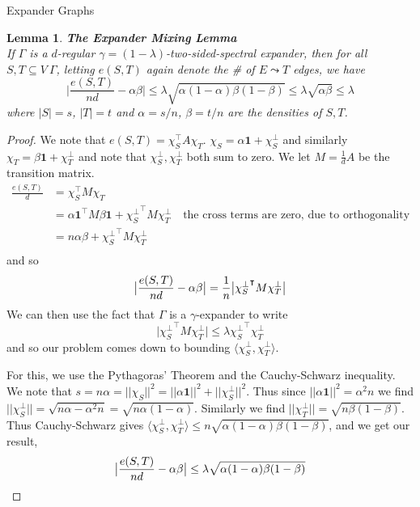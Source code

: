 \documentclass{article}
\newtheorem{lemma}{Lemma}
\begin{document}
\begin{section}{Expander Graphs}
  \begin{lemma}{\textbf{The Expander Mixing Lemma}\\}
    If $\Gamma$ is a $d$-regular $\gamma=(1-\lambda)$-two-sided-spectral expander, then
    for all $S,T \subseteq V~\Gamma$, letting $e(S,T)$ again denote the \# of $E \leadsto T$ edges, we have
    $$
    \big|\frac{e(S,T)}{nd} - \alpha\beta\big| \leq \lambda\sqrt{\alpha(1-\alpha)\beta(1-\beta)} \leq \lambda\sqrt{\alpha\beta} \leq \lambda 
    $$
    where $|S| = s$, $|T| = t$ and $\alpha = s/n$, $\beta = t/n$ are the \emph{densities} of $S,T$.
  \end{lemma}
  \begin{proof}
    We note that $e(S,T) = \chi_S^\intercal A \chi_T$.
    $\chi_S = \alpha \mathbf{1} + \chi_S^\perp$ and similarly $\chi_T = \beta\mathbf{1} + \chi_T^\perp$ and note that 
    $\chi_S^\perp, \chi_T^\perp$ both sum to zero.
    We let $M = \frac{1}{d}A$ be the transition matrix. 
    \begin{equation}
      \begin{aligned}
	\frac{e(S,T)}{d} &= \chi_S^\intercal M \chi_T\\
	~&= \alpha\mathbf 1^\intercal M \beta\mathbf 1 + {\chi_S^\perp}^\intercal M \chi_T^\perp \quad \text{the cross terms are zero, due to orthogonality}\\
	~&= n\alpha\beta + {\chi_S^\perp}^\intercal M \chi_T^\perp\\
      \end{aligned}
    \end{equation}
    and so
    $$
	\big|\frac{e(S,T)}{nd} - \alpha\beta\big| = \frac{1}{n}\big|{\chi_S^\perp}^\intercal M \chi_T^\perp\big|\\
    $$
    We can then use the fact that $\Gamma$ is a $\gamma$-expander to write
    $$
	\big|{\chi_S^\perp}^\intercal M \chi_T^\perp\big| \leq \lambda{\chi_S^\perp}^\intercal\chi_T^\perp
    $$
    and so our problem comes down to bounding $\langle \chi_S^\perp, \chi_T^\perp \rangle$.

    For this, we use the Pythagoras' Theorem and the Cauchy-Schwarz inequality.
    We note that $s = n\alpha = ||\chi_S||^2 = ||\alpha\mathbf 1||^2 + ||\chi_S^\perp||^2$.
    Thus since $||\alpha\mathbf 1||^2 = \alpha^2n$ we find $||\chi_S^\perp|| = \sqrt{n\alpha - \alpha^2n} = \sqrt{n\alpha(1-\alpha)}$. 
    Similarly we find $||\chi_T^\perp|| = \sqrt{n\beta(1-\beta)}$.
    Thus Cauchy-Schwarz gives $\langle \chi_S^\perp, \chi_T^\perp \rangle \leq n\sqrt{\alpha(1-\alpha)\beta(1-\beta)}$, and we get our result,
    $$
	\big|\frac{e(S,T)}{nd} - \alpha\beta\big| \leq \lambda\sqrt{\alpha(1-\alpha)\beta(1-\beta)}\\
    $$
    

\end{proof}
\end{section}
\end{document}

